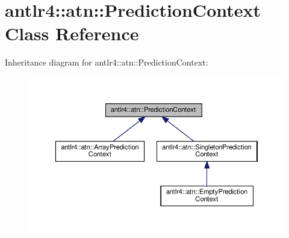 \hypertarget{classantlr4_1_1atn_1_1PredictionContext}{}\section{antlr4\+:\+:atn\+:\+:Prediction\+Context Class Reference}
\label{classantlr4_1_1atn_1_1PredictionContext}


Inheritance diagram for antlr4\+:\+:atn\+:\+:Prediction\+Context\+:
\nopagebreak
\begin{figure}[H]
\begin{center}
\leavevmode
\includegraphics[width=350pt]{classantlr4_1_1atn_1_1PredictionContext__inherit__graph}
\end{center}
\end{figure}
